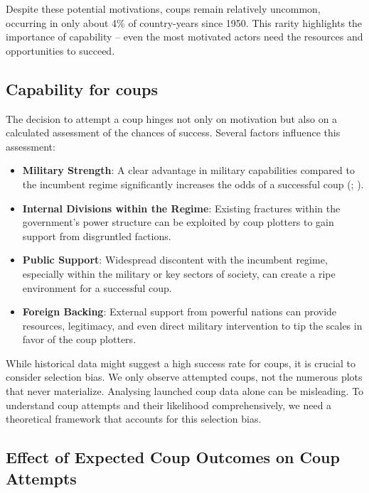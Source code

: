 \documentclass[
  12pt,
]{report}
\begin{document}
Despite these potential motivations, coups remain relatively uncommon,
occurring in only about 4\% of country-years since 1950. This rarity
highlights the importance of capability -- even the most motivated
actors need the resources and opportunities to succeed.

\subsection{Capability for coups}\label{capability-for-coups}

The decision to attempt a coup hinges not only on motivation but also on
a calculated assessment of the chances of success. Several factors
influence this assessment:

\begin{itemize}
\item
  \textbf{Military Strength}: A clear advantage in military capabilities
  compared to the incumbent regime significantly increases the odds of a
  successful coup (;
  ).
\item
  \textbf{Internal Divisions within the Regime}: Existing fractures
  within the government's power structure can be exploited by coup
  plotters to gain support from disgruntled factions.
\item
  \textbf{Public Support}: Widespread discontent with the incumbent
  regime, especially within the military or key sectors of society, can
  create a ripe environment for a successful coup.
\item
  \textbf{Foreign Backing}: External support from powerful nations can
  provide resources, legitimacy, and even direct military intervention
  to tip the scales in favor of the coup plotters.
\end{itemize}

While historical data might suggest a high success rate for coups, it is
crucial to consider selection bias. We only observe attempted coups, not
the numerous plots that never materialize. Analysing launched coup data
alone can be misleading. To understand coup attempts and their
likelihood comprehensively, we need a theoretical framework that
accounts for this selection bias.

\subsection{\texorpdfstring{\textbf{Effect of Expected Coup Outcomes on
Coup
Attempts}}{Effect of Expected Coup Outcomes on Coup Attempts}}\label{effect-of-expected-coup-outcomes-on-coup-attempts}
\end{document}

